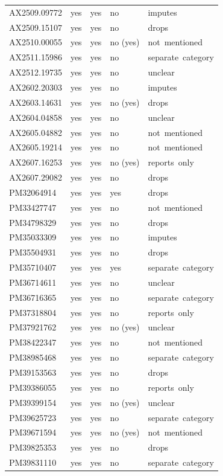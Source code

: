 \begin{longtable}{@{}p{0.9in}p{0.42in}p{0.42in}p{0.55in}p{1.7in}@{}}
AX2509.09772 & yes & yes & no & imputes\\
AX2509.15107 & yes & yes & no & drops\\
AX2510.00055 & yes & yes & no (yes) & not\ mentioned\\
AX2511.15986 & yes & yes & no & separate\ category\\
AX2512.19735 & yes & yes & no & unclear\\
AX2602.20303 & yes & yes & no & imputes\\
AX2603.14631 & yes & yes & no (yes) & drops\\
AX2604.04858 & yes & yes & no & unclear\\
AX2605.04882 & yes & yes & no & not\ mentioned\\
AX2605.19214 & yes & yes & no & not\ mentioned\\
AX2607.16253 & yes & yes & no (yes) & reports\ only\\
AX2607.29082 & yes & yes & no & drops\\
PM32064914 & yes & yes & yes & drops\\
PM33427747 & yes & yes & no & not\ mentioned\\
PM34798329 & yes & yes & no & drops\\
PM35033309 & yes & yes & no & imputes\\
PM35504931 & yes & yes & no & drops\\
PM35710407 & yes & yes & yes & separate\ category\\
PM36714611 & yes & yes & no & unclear\\
PM36716365 & yes & yes & no & separate\ category\\
PM37318804 & yes & yes & no & reports\ only\\
PM37921762 & yes & yes & no (yes) & unclear\\
PM38422347 & yes & yes & no & not\ mentioned\\
PM38985468 & yes & yes & no & separate\ category\\
PM39153563 & yes & yes & no & drops\\
PM39386055 & yes & yes & no & reports\ only\\
PM39399154 & yes & yes & no (yes) & unclear\\
PM39625723 & yes & yes & no & separate\ category\\
PM39671594 & yes & yes & no (yes) & not\ mentioned\\
PM39825353 & yes & yes & no & drops\\
PM39831110 & yes & yes & no & separate\ category\\

\end{longtable}
